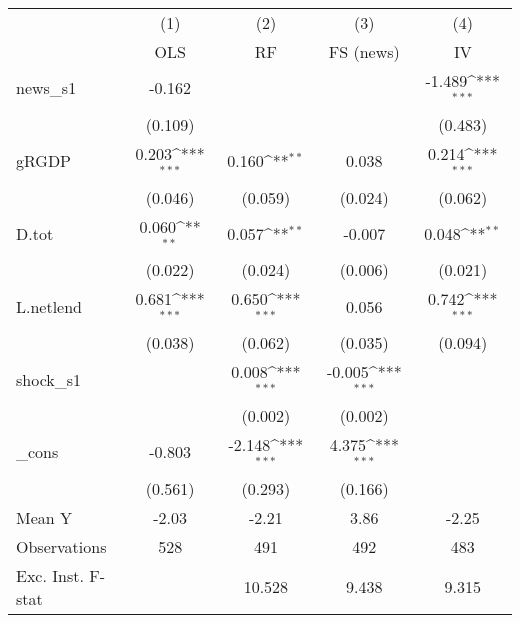 {
\def\sym#1{\ifmmode^{#1}\else\(^{#1}\)\fi}
\begin{tabular}{l*{4}{c}}
\toprule
            &\multicolumn{1}{c}{(1)}&\multicolumn{1}{c}{(2)}&\multicolumn{1}{c}{(3)}&\multicolumn{1}{c}{(4)}\\
            &\multicolumn{1}{c}{OLS}&\multicolumn{1}{c}{RF}&\multicolumn{1}{c}{FS (news)}&\multicolumn{1}{c}{IV}\\
\midrule
news\_s1     &      -0.162         &                     &                     &      -1.489\sym{***}\\
            &     (0.109)         &                     &                     &     (0.483)         \\
\addlinespace
gRGDP       &       0.203\sym{***}&       0.160\sym{**} &       0.038         &       0.214\sym{***}\\
            &     (0.046)         &     (0.059)         &     (0.024)         &     (0.062)         \\
\addlinespace
D.tot       &       0.060\sym{**} &       0.057\sym{**} &      -0.007         &       0.048\sym{**} \\
            &     (0.022)         &     (0.024)         &     (0.006)         &     (0.021)         \\
\addlinespace
L.netlend   &       0.681\sym{***}&       0.650\sym{***}&       0.056         &       0.742\sym{***}\\
            &     (0.038)         &     (0.062)         &     (0.035)         &     (0.094)         \\
\addlinespace
shock\_s1    &                     &       0.008\sym{***}&      -0.005\sym{***}&                     \\
            &                     &     (0.002)         &     (0.002)         &                     \\
\addlinespace
\_cons      &      -0.803         &      -2.148\sym{***}&       4.375\sym{***}&                     \\
            &     (0.561)         &     (0.293)         &     (0.166)         &                     \\
\midrule
Mean Y      &       -2.03         &       -2.21         &        3.86         &       -2.25         \\
Observations&         528         &         491         &         492         &         483         \\
Exc. Inst. F-stat&                     &      10.528         &       9.438         &       9.315         \\
\bottomrule
\end{tabular}
}
